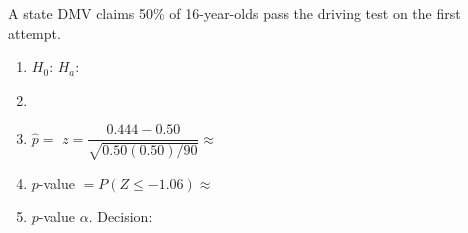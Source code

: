 \documentclass[10pt]{article}
\begin{document}
\namedateperiod

\vspace{0.15in}

A state DMV claims 50\% of 16-year-olds pass the driving test on the first attempt.

\begin{enumerate}
  \item $H_0$:  \quad $H_a$: 

  \item {}

  \item $\hat p = $  \quad $z = \dfrac{0.444-0.50}{\sqrt{0.50(0.50)/90}} \approx $ 

  \item $p$-value $= P(Z\le-1.06) \approx$ 

  \item $p$-value \ans{$>$} $\alpha$. Decision: 
\end{enumerate}
\end{document}
